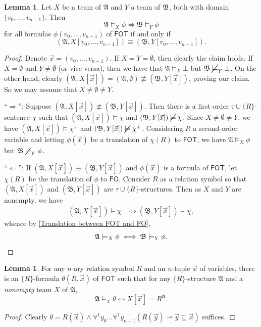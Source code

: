 \documentclass[a4paper]{amsart}
\theoremstyle{definition}
\newtheorem{lemma}[definition]{Lemma}
\theoremstyle{remark}
\newcommand{\A}{\mathcal{A}}
\newcommand{\B}{\mathcal{B}}
\newcommand{\vx}{\vec{x}}
\newcommand{\vy}{\vec{y}}
\newcommand{\forallone}{\forall^1}
\newcommand\fol{\mathsf{FO}}
\newcommand\fot{\mathsf{FOT}}
\newcommand\nmodels{\mathbin{\cancel{\models}}}
\theoremstyle{definition}
\renewcommand{\A}{\mathfrak{A}}
\renewcommand{\B}{\mathfrak{B}}
\newcommand{\wcimp}{\rightarrowtriangle}
\begin{document}
\begin{lemma}\label{teams_elementary_equivalent_as_predicates}
    Let $X$ be a team of $\A$ and $Y$ a team of $\B$, both with domain $\{v_0,\dots,v_{n-1}\}$. Then
    \[
        \A\models_X \phi \iff \B\models_Y \phi
    \]
    for all formulas $\phi(v_0,\dots,v_{n-1})$ of $\fot$ if and only if
    \[
        (\A, X[v_0,\dots,v_{n-1}]) \equiv (\B, Y[v_0,\dots,v_{n-1}]).
    \]
\end{lemma}
\begin{proof}
    Denote $\vx = (v_0,\dots,v_{n-1})$. If $X=Y=\emptyset$, then clearly the claim holds. If $X=\emptyset$ and $Y\neq\emptyset$ (or vice versa), then we have that $\A\models_X\bot$ but $\B\nmodels_Y\bot$. On the other hand, clearly $(\A, X[\vx]) = (\A,\emptyset)\not\equiv(\B, Y[\vx])$, proving our claim. So we may assume that $X\neq\emptyset\neq Y$.

    ``$\Longrightarrow$'': Suppose $(\A, X[\vx])\not\equiv(\B, Y[\vx])$. Then there is a first-order $\tau\cup\{R\}$-sentence $\chi$ such that $(\A, X[\vx])\models\chi$ and $(\B, Y[\vx])\nmodels\chi$. Since $X\neq\emptyset\neq Y$, we have $(\A,X[\vx])\models\chi^+$ and $(\B,Y[\vx])\nmodels\chi^+$. Considering $R$ a second-order variable and letting $\phi(\vx)$ be a translation of $\chi(R)$ to $\fot$, we have $\A\models_X\phi$ but $\B\nmodels_Y\phi$.

    ``$\Longleftarrow$'': If $(\A, X[\vx]) \equiv (\B, Y[\vx])$ and $\phi(\vx)$ is a formula of $\fot$, let $\chi(R)$ be the translation of $\phi$ to $\fol$. Consider $R$ as a relation symbol so that $(\A,X[\vx])$ and $(\B,Y[\vx])$ are $\tau\cup\{R\}$-structures. Then as $X$ and $Y$ are nonempty, we have
    \begin{align*}
        (\A, X[\vx])\models\chi &\iff (\B, Y[\vx])\models\chi,
    \end{align*}
    whence by \cref{Translation between FOT and FO},
    \[
        \A\models_X\phi \iff \B\models_Y\phi. \qedhere
    \]
\end{proof}




\begin{lemma}\label{FOT-formula that characterises being a predicate}
    For any $n$-ary relation symbol $R$ and an $n$-tuple $\vx$ of variables, there is an $\{R\}$-formula $\theta(R,\vx)$ of $\fot$ such that for any $\{R\}$-structure $\A$ and a \emph{nonempty} team $X$ of $\A$,
    \[
        \A\models_X\theta \iff X[\vx] = R^\A.
    \]
\end{lemma}
\begin{proof}
    Clearly $\theta = R(\vx) \land \forallone y_0\dots\forallone y_{n-1} ( R(\vy) \wcimp \vy\subseteq\vx)$ suffices.
\end{proof}
\end{document}
